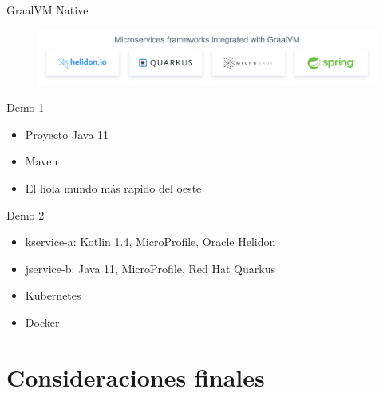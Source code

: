 \documentclass[aspectratio=169]{beamer}
\begin{document}
\begin{frame}{GraalVM Native}
	\begin{figure}
		\centering
		\includegraphics[width=\linewidth]{Images/implementacionesnative}
	\end{figure}
\end{frame}

\begin{frame}{Demo 1}
	\begin{itemize}
		\item Proyecto Java 11
		\item Maven
		\item El hola mundo más rapido del oeste
	\end{itemize}
\end{frame}

\begin{frame}{Demo 2}
	\begin{itemize}
		\item kservice-a: Kotlin 1.4, MicroProfile, Oracle Helidon
		\item jservice-b: Java 11, MicroProfile, Red Hat Quarkus
		\item Kubernetes
		\item Docker
	\end{itemize}
\end{frame}



{
	\section{Consideraciones finales}
}
\end{document}
